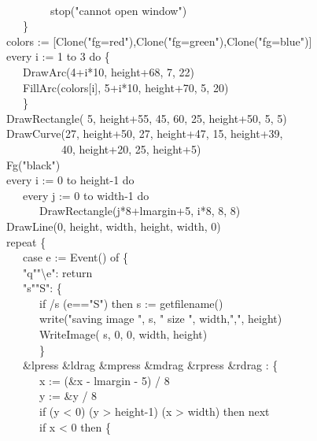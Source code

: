 {{\textbar} \\
 \ \ \ \ \ \ \ \ stop("cannot open window") \\
\>   \ \ \ \} \\
\>   colors :=
[Clone("fg=red"),Clone("fg=green"),Clone("fg=blue")] \\
\>   every i := 1 to 3 do \{ \\
\>   \ \ \ DrawArc(4+i*10, height+68, 7, 22) \\
\>   \ \ \ FillArc(colors[i], 5+i*10, height+70, 5, 20) \\
\>   \ \ \ \} \\
\>   DrawRectangle( 5, height+55, 45, 60, 25, height+50, 5, 5) \\
\>   DrawCurve(27, height+50, 27, height+47, 15, height+39, \\
\>   \ \ \ \ \ \ \ \ \ \ 40, height+20, 25, height+5) \\
\>   Fg("black") \\
\>   every i := 0 to height-1 do \\
\>   \ \ \ every j := 0 to width-1 do \\
\>   \ \ \ \ \ \ DrawRectangle(j*8+lmargin+5, i*8, 8, 8) \\
\>   DrawLine(0, height, width, height, width, 0) \\
\>   repeat \{ \\
\>   \ \ \ case e := Event() of \{ \\
\>   \ \ \ "q"{\textbar}"{\textbackslash}e":
return \\
\>   \ \ \ "s"{\textbar}"S":
\{ \\
\>   \ \ \ \ \ \ if /s {\textbar} (e=="S")
then s := getfilename() \\
\>   \ \ \ \ \ \ write("saving image ", s,
" size ",
width,",", height) \\
\>   \ \ \ \ \ \ WriteImage( s, 0, 0, width, height) \\
\>   \ \ \ \ \ \ \} \\
\>   \ \ \ \&lpress {\textbar} \&ldrag {\textbar} \&mpress {\textbar}
\&mdrag {\textbar} \&rpress {\textbar} \&rdrag : \{ \\
\>   \ \ \ \ \ \ x := (\&x - lmargin - 5) / 8 \\
\>   \ \ \ \ \ \ y := \&y / 8 \\
\>   \ \ \ \ \ \ if (y {\textless} 0) {\textbar} (y {\textgreater}
height-1) {\textbar} (x {\textgreater} width) then next \\
\>   \ \ \ \ \ \ if x {\textless} 0 then \{ \\
}
